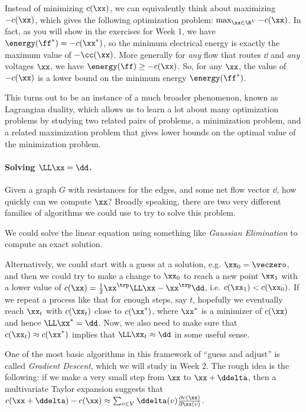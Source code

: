 Instead of minimizing $c(\xx)$, we can equivalently think about maximizing
$-c(\xx)$, which gives the following optimization problem: $\max_{\xx \in \R^V} -c(\xx)$.
In fact, as you will show in the exercises for Week 1,
we have $\energy(\ff^*) = -c(\xx^*)$, so the
minimum electrical energy is exactly the maximum value of
$-\cc(\xx)$.
More generally for \emph{any} flow that routes $\dd$ and \emph{any}
voltages $\xx$, we have $\energy(\ff) \geq -c(\xx)$.
So, for any $\xx$, the value of $-c(\xx)$ is a lower bound on the
minimum energy $\energy(\ff^*)$.

This turns out to be an instance of a much broader phenomenon, known
as Lagrangian duality, which allows us to learn a lot about many
optimization problems by studying two related pairs of problems, a
minimization problem, and a related maximization problem that gives
lower bounds on the optimal value of the minimization problem.

\paragraph{Solving $\LL \xx = \dd$.}
Given a graph $G$ with resistances for the edges, and some net flow
vector $\dd$, how quickly can we compute $\xx$?
%
Broadly speaking, there are two very different families of algorithms
we could use to try to solve this problem.

We could solve the linear equation using something like
\emph{Gaussian Elimination} to compute an exact solution.

Alternatively,
we could start with a guess at a solution, e.g. $\xx_0
= \veczero$, and then we could try to make a change to $\xx_0$ to reach
a new point $\xx_1$ with a lower value of $c(\xx) = \frac{1}{2} \xx^{\trp} \LL \xx -
\xx^{\trp}\dd$, i.e. $c(\xx_1) < c(\xx_0)$.
If we repeat a process like that for enough steps, say $t$, hopefully we
eventually reach $\xx_t$ with $c(\xx_t)$ close to $c(\xx^*)$, where
$\xx^*$ is a minimizer of $c(\xx)$ and hence $\LL \xx^* = \dd$.
Now, we also need to make sure that $c(\xx_t) \approx c(\xx^*)$
implies that $\LL \xx_t \approx \dd$ in some useful sense.

One of the most basic algorithms in this framework of ``guess and adjust''
is called \emph{Gradient Descent}, which we will study in Week 2.
The rough idea is the following: if we make a very small step from $\xx$ to
$\xx + \ddelta$, then a multivariate Taylor expansion suggests that
$c(\xx + \ddelta) - c(\xx) \approx \sum_{v \in V} \ddelta(v)
\frac{\partial c(\xx)}{\partial\xx(v)} $.

